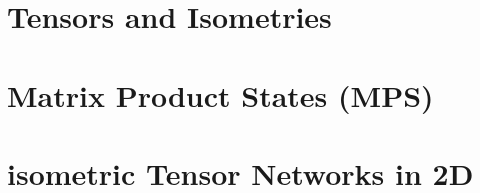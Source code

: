 \section{Tensors and Isometries}


\section{Matrix Product States (MPS)}

\section{isometric Tensor Networks in 2D}